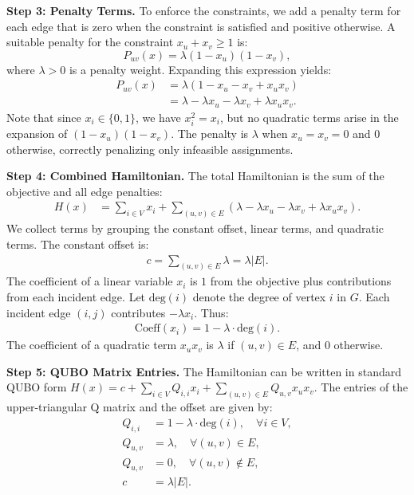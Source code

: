 \documentclass[12pt]{article}
\begin{document}
\textbf{Step 3: Penalty Terms.}
To enforce the constraints, we add a penalty term for each edge that is zero when the constraint is satisfied and positive otherwise. A suitable penalty for the constraint $x_u + x_v \ge 1$ is:
\[
P_{uv}(x) = \lambda (1 - x_u)(1 - x_v),
\]
where $\lambda > 0$ is a penalty weight. Expanding this expression yields:
\begin{align}
P_{uv}(x) &= \lambda (1 - x_u - x_v + x_u x_v) \nonumber \\
&= \lambda - \lambda x_u - \lambda x_v + \lambda x_u x_v.
\end{align}
Note that since $x_i \in \{0,1\}$, we have $x_i^2 = x_i$, but no quadratic terms arise in the expansion of $(1-x_u)(1-x_v)$. The penalty is $\lambda$ when $x_u=x_v=0$ and $0$ otherwise, correctly penalizing only infeasible assignments.

\textbf{Step 4: Combined Hamiltonian.}
The total Hamiltonian is the sum of the objective and all edge penalties:
\begin{align}
H(x) &= \sum_{i \in V} x_i + \sum_{(u, v) \in E} \left( \lambda - \lambda x_u - \lambda x_v + \lambda x_u x_v \right).
\end{align}
We collect terms by grouping the constant offset, linear terms, and quadratic terms. The constant offset is:
\begin{align}
c = \sum_{(u, v) \in E} \lambda = \lambda |E|.
\end{align}
The coefficient of a linear variable $x_i$ is $1$ from the objective plus contributions from each incident edge. Let $\text{deg}(i)$ denote the degree of vertex $i$ in $G$. Each incident edge $(i, j)$ contributes $-\lambda x_i$. Thus:
\begin{align}
\text{Coeff}(x_i) = 1 - \lambda \cdot \text{deg}(i).
\end{align}
The coefficient of a quadratic term $x_u x_v$ is $\lambda$ if $(u, v) \in E$, and $0$ otherwise.

\textbf{Step 5: QUBO Matrix Entries.}
The Hamiltonian can be written in standard QUBO form $H(x) = c + \sum_{i \in V} Q_{i,i} x_i + \sum_{(u, v) \in E} Q_{u,v} x_u x_v$. The entries of the upper-triangular Q matrix and the offset are given by:
\begin{align}
Q_{i,i} &= 1 - \lambda \cdot \text{deg}(i), \quad \forall i \in V, \\
Q_{u,v} &= \lambda, \quad \forall (u, v) \in E, \\
Q_{u,v} &= 0, \quad \forall (u, v) \notin E, \\
c &= \lambda |E|.
\end{align}
\end{document}

